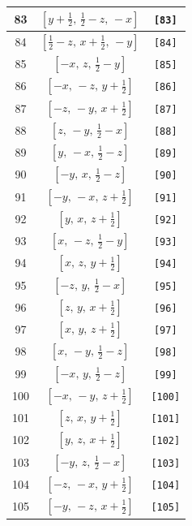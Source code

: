 \documentclass[fleqn,8pt]{jsarticle}
\begin{document}
\begin{longtable}{ccc}
83 & $\left[ y + \frac{1}{2},\, \frac{1}{2} - z,\, - x \right]$ & {\tt [83]} \\ \hline
84 & $\left[ \frac{1}{2} - z,\, x + \frac{1}{2},\, - y \right]$ & {\tt [84]} \\ \hline
85 & $\left[ - x,\, z,\, \frac{1}{2} - y \right]$ & {\tt [85]} \\ \hline
86 & $\left[ - x,\, - z,\, y + \frac{1}{2} \right]$ & {\tt [86]} \\ \hline
87 & $\left[ - z,\, - y,\, x + \frac{1}{2} \right]$ & {\tt [87]} \\ \hline
88 & $\left[ z,\, - y,\, \frac{1}{2} - x \right]$ & {\tt [88]} \\ \hline
89 & $\left[ y,\, - x,\, \frac{1}{2} - z \right]$ & {\tt [89]} \\ \hline
90 & $\left[ - y,\, x,\, \frac{1}{2} - z \right]$ & {\tt [90]} \\ \hline
91 & $\left[ - y,\, - x,\, z + \frac{1}{2} \right]$ & {\tt [91]} \\ \hline
92 & $\left[ y,\, x,\, z + \frac{1}{2} \right]$ & {\tt [92]} \\ \hline
93 & $\left[ x,\, - z,\, \frac{1}{2} - y \right]$ & {\tt [93]} \\ \hline
94 & $\left[ x,\, z,\, y + \frac{1}{2} \right]$ & {\tt [94]} \\ \hline
95 & $\left[ - z,\, y,\, \frac{1}{2} - x \right]$ & {\tt [95]} \\ \hline
96 & $\left[ z,\, y,\, x + \frac{1}{2} \right]$ & {\tt [96]} \\ \hline
97 & $\left[ x,\, y,\, z + \frac{1}{2} \right]$ & {\tt [97]} \\ \hline
98 & $\left[ x,\, - y,\, \frac{1}{2} - z \right]$ & {\tt [98]} \\ \hline
99 & $\left[ - x,\, y,\, \frac{1}{2} - z \right]$ & {\tt [99]} \\ \hline
100 & $\left[ - x,\, - y,\, z + \frac{1}{2} \right]$ & {\tt [100]} \\ \hline
101 & $\left[ z,\, x,\, y + \frac{1}{2} \right]$ & {\tt [101]} \\ \hline
102 & $\left[ y,\, z,\, x + \frac{1}{2} \right]$ & {\tt [102]} \\ \hline
103 & $\left[ - y,\, z,\, \frac{1}{2} - x \right]$ & {\tt [103]} \\ \hline
104 & $\left[ - z,\, - x,\, y + \frac{1}{2} \right]$ & {\tt [104]} \\ \hline
105 & $\left[ - y,\, - z,\, x + \frac{1}{2} \right]$ & {\tt [105]} \\ \hline

\end{longtable}
\end{document}
